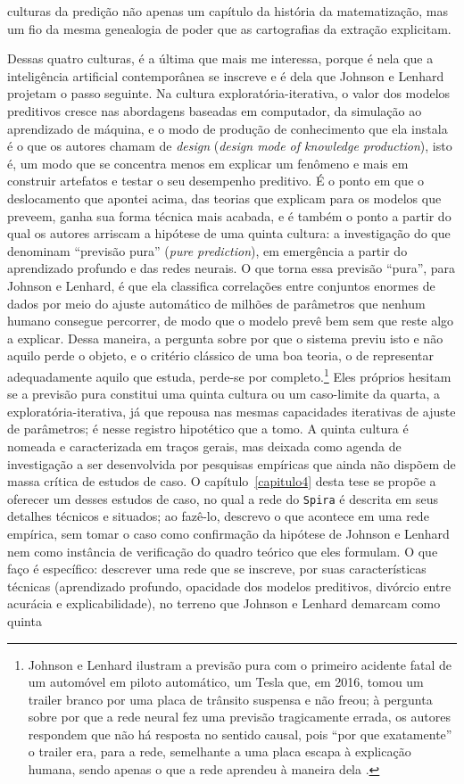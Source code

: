 culturas da predição não apenas um capítulo da história da matematização, mas um fio da mesma genealogia de poder que as cartografias da extração explicitam.

Dessas quatro culturas, é a última que mais me interessa, porque é nela que a inteligência artificial contemporânea se inscreve e é dela que Johnson e Lenhard projetam o passo seguinte. Na cultura exploratória-iterativa, o valor dos modelos preditivos cresce nas abordagens baseadas em computador, da simulação ao aprendizado de máquina, e o modo de produção de conhecimento que ela instala é o que os autores chamam de \textit{design} (\textit{design mode of knowledge production}), isto é, um modo que se concentra menos em explicar um fenômeno e mais em construir artefatos e testar o seu desempenho preditivo. É o ponto em que o deslocamento que apontei acima, das teorias que explicam para os modelos que preveem, ganha sua forma técnica mais acabada, e é também o ponto a partir do qual os autores arriscam a hipótese de uma quinta cultura: a investigação do que denominam \enquote{previsão pura} (\textit{pure prediction}), em emergência a partir do aprendizado profundo e das redes neurais. O que torna essa previsão \enquote{pura}, para Johnson e Lenhard, é que ela classifica correlações entre conjuntos enormes de dados por meio do ajuste automático de milhões de parâmetros que nenhum humano consegue percorrer, de modo que o modelo prevê bem sem que reste algo a explicar. Dessa maneira, a pergunta sobre por que o sistema previu isto e não aquilo perde o objeto, e o critério clássico de uma boa teoria, o de representar adequadamente aquilo que estuda, perde-se por completo.\footnote{Johnson e Lenhard ilustram a previsão pura com o primeiro acidente fatal de um automóvel em piloto automático, um Tesla que, em 2016, tomou um trailer branco por uma placa de trânsito suspensa e não freou; à pergunta sobre por que a rede neural fez uma previsão tragicamente errada, os autores respondem que não há resposta no sentido causal, pois \enquote{por que exatamente} o trailer era, para a rede, semelhante a uma placa escapa à explicação humana, sendo apenas o que a rede aprendeu à maneira dela \parencite[pp.~197--199]{JohnsonLenhard2024}.} Eles próprios hesitam se a previsão pura constitui uma quinta cultura ou um caso-limite da quarta, a exploratória-iterativa, já que repousa nas mesmas capacidades iterativas de ajuste de parâmetros; é nesse registro hipotético que a tomo. A quinta cultura é nomeada e caracterizada em traços gerais, mas deixada como agenda de investigação a ser desenvolvida por pesquisas empíricas que ainda não dispõem de massa crítica de estudos de caso. O capítulo~\ref{capitulo4} desta tese se propõe a oferecer um desses estudos de caso, no qual a rede do \texttt{Spira} é descrita em seus detalhes técnicos e situados; ao fazê-lo, descrevo o que acontece em uma rede empírica, sem tomar o caso como confirmação da hipótese de Johnson e Lenhard nem como instância de verificação do quadro teórico que eles formulam. O que faço é específico: descrever uma rede que se inscreve, por suas características técnicas (aprendizado profundo, opacidade dos modelos preditivos, divórcio entre acurácia e explicabilidade), no terreno que Johnson e Lenhard demarcam como quinta 